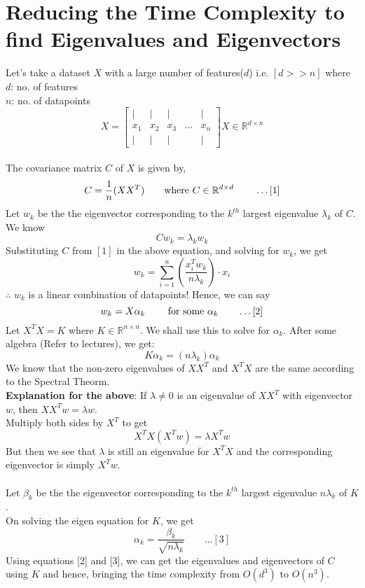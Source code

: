 \documentclass[letterpaper,11pt]{article}
\begin{document}
\section{Reducing the Time Complexity to find Eigenvalues and Eigenvectors}
Let's take a dataset $X$ with a large number of features($d$) i.e. $[d >> n]$ where \\ $d$: no. of features \\ $n$: no. of datapoints
$$
X=\left [
\begin{array}{ccccc}
    | & | & | & & | \\
    x_1 & x_2 & x_3 & \ldots & x_n \\
    | & | & | & & |
\end{array}
\right ]
X \in \mathbb{R} ^{d \times n}
$$ \\
The covariance matrix $C$ of $X$ is given by,
$$
C=\frac{1}{n}(X  X ^T) \text{\hspace{2em}where } C \in \mathbb{R} ^{d \times d} 
\text{\hspace{2em} \ldots}[1]
$$ 
Let $w_k$ be the the eigenvector corresponding to the $k ^{th}$ largest eigenvalue $\lambda _k$ of $C$. \\
We know
$$
Cw_k=\lambda _k w_k
$$
Substituting $C$ from $[1]$ in the above equation, and solving for $w_k$, we get
$$
w_k = \sum _{i=1} ^n (\frac{x_i ^T w_k}{n \lambda _k})\cdot{x_i}
$$
\newpage
$\therefore$ $w_k$ is a linear combination of datapoints! Hence, we can say
$$
w_k= X \alpha _k \text{\hspace{2em} for some } \alpha _k \hspace{2em} \ldots [2]
$$
Let $X ^T X = K$ where $K \in \mathbb{R} ^{n \times n}$. We shall use this to solve for $\alpha _k$. After some algebra (Refer to lectures), we get:
$$
K \alpha _k = (n \lambda _k) \alpha _k
$$
We know that the non-zero eigenvalues of $XX^T$ and $X^T X$ are the same according to the Spectral Theorm.\\ 
\textbf{Explanation for the above}: If $\lambda \ne 0$ is an eigenvalue of $XX^T$ with eigenvector $w$, then $XX^Tw=\lambda w$. \\
Multiply both sides by $X^T$ to get $$X^TX(X^Tw)=\lambda X^Tw$$
But then we see that $\lambda$ is still an eigenvalue for $X^TX$ and the corresponding eigenvector is simply $X^Tw$. \\ \\
Let $\beta _k$ be the the eigenvector corresponding to the $k ^{th}$ largest eigenvalue $n \lambda _k$ of $K$. \\
On solving the eigen equation for $K$, we get
$$
\alpha _k= \frac{\beta _k}{\sqrt{n \lambda _k}} \hspace{2em} \ldots [3]
$$
Using equations [2] and [3], we can get the eigenvalues and eigenvectors of $C$ using $K$ and hence, bringing the time complexity from $O(d ^3)$ to $O(n^3)$.
\end{document}
